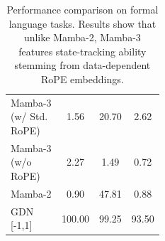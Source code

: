{\begin{table}[!t]
{\begin{subtable}[t]{0.55\textwidth}
\begin{tabular}{@{}>{\raggedright\arraybackslash}p{0.43\linewidth} S[table-format=3.2] S[table-format=3.2] S[table-format=3.2]@{}}
            Mamba-3 (w/ Std. RoPE) & 1.56 & 20.70 & 2.62 \\
            Mamba-3 (w/o RoPE) & 2.27 & 1.49 & 0.72 \\
            Mamba-2 & 0.90 & 47.81 & 0.88 \\
            GDN [-1,1] & 100.00 & 99.25 & 93.50 \\
            \bottomrule
        \end{tabular}
        \endgroup
        \caption{Performance comparison on formal language tasks. Results show that unlike Mamba-2, Mamba-3 features state-tracking ability stemming from data-dependent RoPE embeddings. 
        }
        \label{tab:reasoning}
      \end{subtable}%
    }%
\end{table}
}
